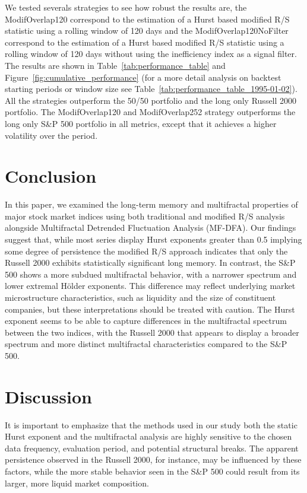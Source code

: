 \documentclass[11pt]{extarticle}
\begin{document}
We tested severals strategies to see how robust the results are, the ModifOverlap120 correspond to the estimation of a
Hurst based modified R/S statistic using a rolling window of 120 days and the ModifOverlap120NoFilter correspond to the estimation of a
Hurst based modified R/S statistic using a rolling window of 120 days without using the inefficiency index as a signal filter.
The results are shown in Table~\ref{tab:performance_table} and Figure~\ref{fig:cumulative_performance} (for a more detail analysis
on backtest starting periods or window size see Table~\ref{tab:performance_table_1995-01-02}).
All the strategies outperform the 50/50 portfolio and the long only Russell 2000 portfolio.
The ModifOverlap120 and ModifOverlap252 strategy outperforms the long only S\&P 500 portfolio in all metrics, except
that it achieves a higher volatility over the period.


\section{Conclusion}

In this paper, we examined the long-term memory and multifractal properties of major stock market indices using both
traditional and modified R/S analysis alongside Multifractal Detrended Fluctuation Analysis (MF-DFA). Our findings
suggest that, while most series display Hurst exponents greater than 0.5 implying some degree of persistence the
modified R/S approach indicates that only the Russell 2000 exhibits statistically significant long memory.
In contrast, the S\&P 500 shows a more subdued multifractal behavior, with a narrower spectrum and lower extremal Hölder
exponents. This difference may reflect underlying market microstructure characteristics, such as liquidity and the size
of constituent companies, but these interpretations should be treated with caution. The Hurst exponent seems to be able
to capture differences in the multifractal spectrum between the two indices, with the Russell 2000 that appears to
display a broader spectrum and more distinct multifractal characteristics compared to the S\&P 500.

\section{Discussion}

It is important to emphasize that the methods used in our study both the static Hurst exponent and the multifractal
analysis are highly sensitive to the chosen data frequency, evaluation period, and potential structural breaks. The
apparent persistence observed in the Russell 2000, for instance, may be influenced by these factors, while the more
stable behavior seen in the S\&P 500 could result from its larger, more liquid market composition.
\end{document}

